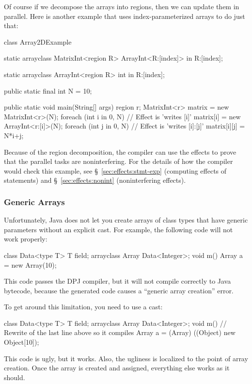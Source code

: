 Of course if we decompose the arrays into regions, then we can update
them in parallel.  Here is another example that uses
index-parameterized arrays to do just that:
%
\begin{dpjlisting}
class Array2DExample {
    static arrayclass MatrixInt<region R> {
        ArrayInt<R:[index]> in R:[index];
    }

    static arrayclass ArrayInt<region R> {
        int in R:[index];
    }

    public static final int N = 10;

    public static void main(String[] args) {
        region r;
        MatrixInt<r> matrix = new MatrixInt<r>(N);
        foreach (int i in 0, N) {
            // Effect is 'writes [i]'
            matrix[i] = new ArrayInt<r:[i]>(N);
            foreach (int j in 0, N) {
                // Effect is 'writes [i]:[j]'
                matrix[i][j] = N*i+j;
            }
        }
    }
}
\end{dpjlisting}
%
Because of the region decomposition, the compiler can use the effects
to prove that the parallel tasks are noninterfering.  For the details
of how the compiler would check this example, see
\S~\ref{sec:effects:stmt-exp} (computing effects of statements) and
\S~\ref{sec:effects:nonint} (noninterfering effects).

\subsubsection{Generic Arrays}

Unfortunately, Java does not let you create arrays of class types that
have generic parameters without an explicit cast.  For example, the
following code will not work properly:
%
\begin{dpjlisting}
class Data<type T> {
    T field;
    arrayclass Array {
        Data<Integer>;
    }
    void m() {
        Array a = new Array(10);
    }
}
\end{dpjlisting}
%
This code passes the DPJ compiler, but it will not compile correctly
to Java bytecode, because the generated code causes a ``generic array
creation'' error.

To get around this limitation, you need to use a cast:
%
\begin{dpjlisting}
class Data<type T> {
    T field;
    arrayclass Array {
        Data<Integer>;
    }
    void m() {
        // Rewrite of the last line above so it compiles
        Array a = (Array) ((Object) new Object[10]);
    }
}
\end{dpjlisting}
%
This code is ugly, but it works.  Also, the ugliness is localized to
the point of array creation.  Once the array is created and assigned,
everything else works as it should.

